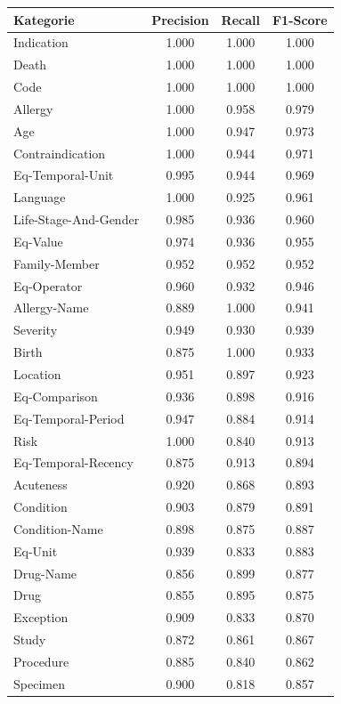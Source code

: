 \begin{table}[htbp]
\centering
\begin{tabular}{p{5cm}ccc}
\toprule
\textbf{Kategorie} & \textbf{Precision} & \textbf{Recall} & \textbf{F1-Score} \\
\midrule
Indication & 1.000 & 1.000 & 1.000 \\
Death & 1.000 & 1.000 & 1.000 \\
Code & 1.000 & 1.000 & 1.000 \\
Allergy & 1.000 & 0.958 & 0.979 \\
Age & 1.000 & 0.947 & 0.973 \\
Contraindication & 1.000 & 0.944 & 0.971 \\
Eq-Temporal-Unit & 0.995 & 0.944 & 0.969 \\
Language & 1.000 & 0.925 & 0.961 \\
Life-Stage-And-Gender & 0.985 & 0.936 & 0.960 \\
Eq-Value & 0.974 & 0.936 & 0.955 \\
Family-Member & 0.952 & 0.952 & 0.952 \\
Eq-Operator & 0.960 & 0.932 & 0.946 \\
Allergy-Name & 0.889 & 1.000 & 0.941 \\
Severity & 0.949 & 0.930 & 0.939 \\
Birth & 0.875 & 1.000 & 0.933 \\
Location & 0.951 & 0.897 & 0.923 \\
Eq-Comparison & 0.936 & 0.898 & 0.916 \\
Eq-Temporal-Period & 0.947 & 0.884 & 0.914 \\
Risk & 1.000 & 0.840 & 0.913 \\
Eq-Temporal-Recency & 0.875 & 0.913 & 0.894 \\
Acuteness & 0.920 & 0.868 & 0.893 \\
Condition & 0.903 & 0.879 & 0.891 \\
Condition-Name & 0.898 & 0.875 & 0.887 \\
Eq-Unit & 0.939 & 0.833 & 0.883 \\
Drug-Name & 0.856 & 0.899 & 0.877 \\
Drug & 0.855 & 0.895 & 0.875 \\
Exception & 0.909 & 0.833 & 0.870 \\
Study & 0.872 & 0.861 & 0.867 \\
Procedure & 0.885 & 0.840 & 0.862 \\
Specimen & 0.900 & 0.818 & 0.857 \\

\end{tabular}
\end{table}
